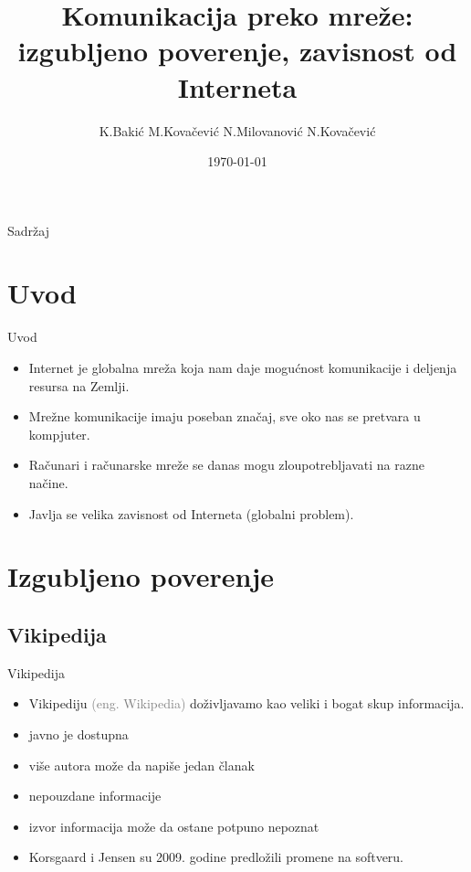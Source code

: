 \documentclass{beamer}
\title[\color{gray}Komunikacija preko mreže]{Komunikacija preko mreže:\\izgubljeno poverenje, zavisnost od Interneta}
\author{K.Bakić M.Kovačević N.Milovanović N.Kovačević}
\institute{Matematički fakultet, Beograd}
\date{\today}
\begin{document}
	\begin{frame}
	
	  \titlepage
	\end{frame}

	\begin{frame}{Sadržaj}
		\tableofcontents 
	\end{frame}
	
	\section{Uvod}
		\begin{frame}{Uvod}
			\begin{itemize}
				\item Internet je globalna mreža koja nam daje mogućnost komunikacije i deljenja resursa na Zemlji. 
				\item Mrežne komunikacije imaju poseban značaj, sve oko nas se pretvara u kompjuter.
				\item Računari i računarske mreže se danas mogu zloupotrebljavati na razne načine.
				\item Javlja se velika zavisnost od Interneta (globalni problem).
			\end{itemize}
		\end{frame}
	\section{Izgubljeno poverenje}
		\subsection*{Vikipedija}
			\begin{frame}{Vikipedija}
			\begin{itemize}
				\item Vikipediju \textcolor{gray}{(eng. Wikipedia)} doživljavamo kao veliki i bogat skup informacija.
				\item javno je dostupna
				\item više autora može da napiše jedan članak		
				\item nepouzdane informacije	 
				\item izvor informacija može da ostane potpuno nepoznat
				\item Korsgaard i Jensen su 2009. godine predložili promene na softveru.
			 \end{itemize}
			\end{frame}
	
\end{document}

